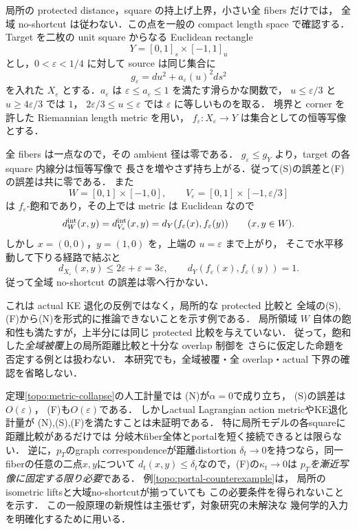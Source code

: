 \begin{example}
\label{topo:protected-thin-bypass}
局所の protected distance，square の持上げ上界，小さい全 fibers だけでは，
全域 no-shortcut は従わない．この点を一般の compact length space で確認する．
Target を二枚の unit square からなる Euclidean rectangle
\[
 Y=[0,1]_s\times[-1,1]_u
\]
とし，$0<\varepsilon<1/4$ に対して source は同じ集合に
\[
 g_\varepsilon=du^2+a_\varepsilon(u)^2ds^2
\]
を入れた $X_\varepsilon$ とする．$a_\varepsilon$ は
$\varepsilon\le a_\varepsilon\le1$ を満たす滑らかな関数で，
$u\le\varepsilon/3$ と $u\ge4\varepsilon/3$ では $1$，
$2\varepsilon/3\le u\le\varepsilon$ では $\varepsilon$ に等しいものを取る．
境界と corner を許した Riemannian length metric を用い，
$f_\varepsilon:X_\varepsilon\to Y$ は集合としての恒等写像とする．

全 fibers は一点なので，その ambient 径は零である．
$g_\varepsilon\le g_Y$ より，target の各 square 内線分は恒等写像で
長さを増やさず持ち上がる．従って\textup{(S)}の誤差と\textup{(F)}の誤差は共に零である．
また
\[
 W=[0,1]\times[-1,0],\qquad
 V_\varepsilon=[0,1]\times[-1,\varepsilon/3]
\]
は $f_\varepsilon$-飽和であり，その上では metric は Euclidean なので
\[
 d_W^{\rm int}(x,y)=d_{V_\varepsilon}^{\rm int}(x,y)
 =d_Y(f_\varepsilon(x),f_\varepsilon(y))
 \qquad(x,y\in W).
\]
しかし $x=(0,0)$，$y=(1,0)$ を，上端の $u=\varepsilon$ まで上がり，
そこで水平移動して下りる経路で結ぶと
\[
 d_{X_\varepsilon}(x,y)\le2\varepsilon+\varepsilon=3\varepsilon,
 \qquad d_Y(f_\varepsilon(x),f_\varepsilon(y))=1.
\]
従って全域 no-shortcut の誤差は零へ行かない．

これは actual KE 退化の反例ではなく，局所的な protected 比較と
全域の\textup{(S),(F)}から\textup{(N)}を形式的に推論できないことを示す例である．
局所領域 $W$ 自体の飽和性も満たすが，上半分には同じ protected 比較を与えていない．
従って，飽和した\emph{全域被覆}上の局所距離比較と十分な overlap 制御を
さらに仮定した命題を否定する例とは扱わない．
本研究でも，全域被覆・全 overlap・actual 下界の確認を省略しない．
\end{example}

\begin{remark}[実際の幾何計量への接続に残るもの]
定理\ref{topo:metric-collapse}の人工計量では
\textup{(N)}が$\alpha=0$で成り立ち，
\textup{(S)}の誤差は$O(\varepsilon)$，
\textup{(F)}も$O(\varepsilon)$である．
しかしactual Lagrangian action metricやKE退化計量が
\textup{(N),(S),(F)}を満たすことは未証明である．
特に局所モデルの各squareに距離比較があるだけでは
分岐木fiber全体とportalを短く接続できるとは限らない．
逆に，$p_T$のgraph correspondenceが距離distortion
$\delta_t\to0$を持つなら，同一fiberの任意の二点$x,y$について
$d_t(x,y)\le\delta_t$なので，\textup{(F)}の$\kappa_t\to0$は
\emph{$p_T$を漸近写像に固定する限り必要}である．
例\ref{topo:portal-counterexample}は，
局所のisometric liftsと大域no-shortcutが揃っていても
この必要条件を得られないことを示す．
この一般原理の新規性は主張せず，対象研究の未解決な
幾何学的入力を明確化するために用いる．
\end{remark}

